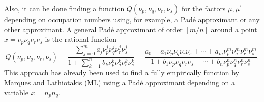 Also, it can be done finding a function 
$Q\left( \nu_p, \nu_q, \nu_r, \nu_s \right)$ for the factors $\mu,\mu^{\prime}$
depending on occupation numbers using, for example,
a Padé approximant or any other approximant.
A general Padé approximant of order $\left[ m / n \right]$ around a point 
$x=\nu_p \nu_q \nu_r \nu_s$ is the rational function 
\begin{equation}
    Q\left( \nu_p, \nu_q, \nu_r, \nu_s \right) =
    \frac{
        \sum_{j = 0}^{m} a_j \nu_p^{j} \nu_q^{j} \nu_r^{j} \nu_s^{j}
    }{
        1 + \sum_{k=1}^{n} b_k \nu_p^{k} \nu_q^{k} \nu_r^{k} \nu_s^{k}
    } =
    \frac{
        a_0 + a_1 \nu_p \nu_q \nu_r \nu_s + \cdots + a_m \nu_p^{m} \nu_q^{m} \nu_r^{m} \nu_s^{m}
    }{
        1 + b_1 \nu_p \nu_q \nu_r \nu_s + \cdots + b_n \nu_p^{n} \nu_q^{n} \nu_r^{n} \nu_s^{n}
    }
    .
\end{equation}
This approach has already been used to find a fully empirically function by Marques
and Lathiotakis (ML) using a Padé approximant
depending on a variable $x = n_p n_q$.

